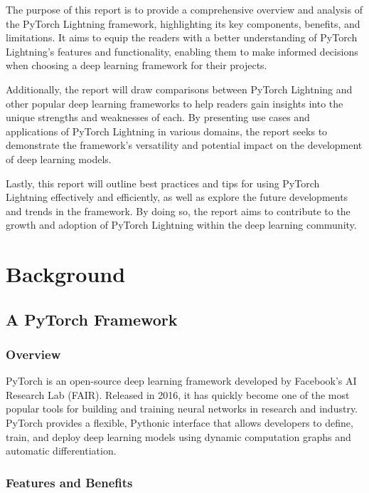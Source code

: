 \documentclass[12pt]{article}
\begin{document}
The purpose of this report is to provide a comprehensive overview and analysis of the PyTorch Lightning framework, highlighting its key components, benefits, and limitations.
It aims to equip the readers with a better understanding of PyTorch Lightning's features and functionality, enabling them to make informed decisions when choosing a deep learning framework for their projects.

Additionally, the report will draw comparisons between PyTorch Lightning and other popular deep learning frameworks to help readers gain insights into the unique strengths and weaknesses of each.
By presenting use cases and applications of PyTorch Lightning in various domains, the report seeks to demonstrate the framework's versatility and potential impact on the development of deep learning models.

Lastly, this report will outline best practices and tips for using PyTorch Lightning effectively and efficiently, as well as explore the future developments and trends in the framework.
By doing so, the report aims to contribute to the growth and adoption of PyTorch Lightning within the deep learning community.

\section{Background}

\subsection{A PyTorch Framework}

\subsubsection{Overview}

PyTorch is an open-source deep learning framework developed by Facebook's AI Research Lab (FAIR). Released in 2016, it has quickly become one of the most popular tools for building and training neural networks in research and industry.
PyTorch provides a flexible, Pythonic interface that allows developers to define, train, and deploy deep learning models using dynamic computation graphs and automatic differentiation.

\subsubsection{Features and Benefits}
\end{document}
